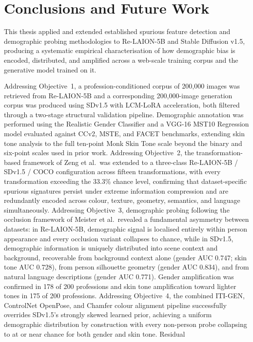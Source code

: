 \section{Conclusions and Future Work}

This thesis applied and extended established spurious feature detection and demographic
probing methodologies to Re-LAION-5B and Stable Diffusion v1.5, producing a systematic
empirical characterisation of how demographic bias is encoded, distributed, and amplified
across a web-scale training corpus and the generative model trained on it.

Addressing Objective~1, a profession-conditioned corpus of 200,000 images was retrieved
from Re-LAION-5B and a corresponding 200,000-image generation corpus was produced using
SDv1.5 with LCM-LoRA acceleration, both filtered through a two-stage structural
validation pipeline. Demographic annotation was performed using the Realistic Gender
Classifier and a VGG-16 MST10 Regression model evaluated against CCv2, MSTE, and FACET
benchmarks, extending skin tone analysis to the full ten-point Monk Skin Tone scale
beyond the binary and six-point scales used in prior work. Addressing Objective~2, the
transformation-based framework of Zeng et al.\ was extended to a three-class
Re-LAION-5B / SDv1.5 / COCO configuration across fifteen transformations, with every
transformation exceeding the 33.3\% chance level, confirming that dataset-specific
spurious signatures persist under extreme information compression and are redundantly
encoded across colour, texture, geometry, semantics, and language simultaneously.
Addressing Objective~3, demographic probing following the occlusion framework of Meister
et al.\ revealed a fundamental asymmetry between datasets: in Re-LAION-5B, demographic
signal is localised entirely within person appearance and every occlusion variant
collapses to chance, while in SDv1.5, demographic information is uniquely distributed
into scene context and background, recoverable from background context alone (gender AUC
0.747; skin tone AUC 0.728), from person silhouette geometry (gender AUC 0.834), and
from natural language descriptions (gender AUC 0.771). Gender amplification was confirmed
in 178 of 200 professions and skin tone amplification toward lighter tones in 175 of 200
professions. Addressing Objective~4, the combined ITI-GEN, ControlNet OpenPose, and
Chamfer colour alignment pipeline successfully overrides SDv1.5's strongly skewed learned
prior, achieving a uniform demographic distribution by construction with every non-person
probe collapsing to at or near chance for both gender and skin tone. Residual
